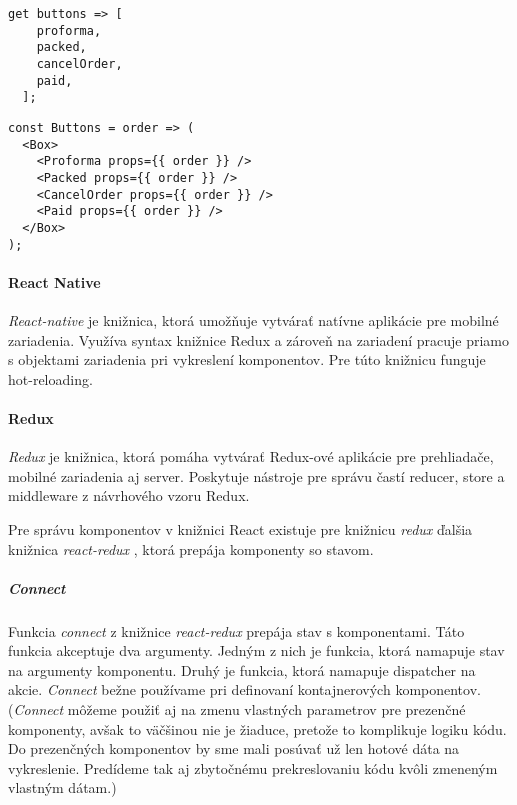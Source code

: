 \begin{lstlisting}[caption=Pole komponentov v Dart-e]
  get buttons => [
    proforma,
    packed,
    cancelOrder,
    paid,
  ];
\end{lstlisting}

\begin{lstlisting}[caption=Pole komponentov v JavaScript-e s použitím knižnice React]
const Buttons = order => (
  <Box>
    <Proforma props={{ order }} />
    <Packed props={{ order }} />
    <CancelOrder props={{ order }} />
    <Paid props={{ order }} />
  </Box>
);
\end{lstlisting}

\paragraph{React Native}
\emph{React-native} \cite{ReactNative} je knižnica, ktorá umožňuje vytvárať natívne aplikácie pre mobilné zariadenia. Využíva syntax knižnice Redux a zároveň na zariadení pracuje priamo s objektami zariadenia pri vykreslení komponentov. Pre túto knižnicu funguje hot-reloading.

\paragraph{Redux}
\emph{Redux} \cite{redux-lib} je knižnica, ktorá pomáha vytvárať Redux-ové aplikácie pre prehliadače, mobilné zariadenia aj server. Poskytuje nástroje pre správu častí reducer, store a middleware z návrhového vzoru Redux. 

Pre správu komponentov v knižnici React existuje pre knižnicu \emph{redux} ďalšia knižnica \emph{react-redux} \cite{react-redux}, ktorá prepája komponenty so stavom.

\subparagraph{Connect}
\label{func:connect}
Funkcia \emph{connect} z knižnice \emph{react-redux} \cite{react-redux} prepája stav s komponentami. Táto funkcia akceptuje dva argumenty. Jedným z nich je funkcia, ktorá namapuje stav na argumenty komponentu. Druhý je funkcia, ktorá namapuje dispatcher na akcie. %
\emph{Connect} bežne používame pri definovaní kontajnerových komponentov.
(\emph{Connect} môžeme použiť aj na zmenu vlastných parametrov pre prezenčné komponenty, avšak to väčšinou nie je žiaduce, pretože to komplikuje logiku kódu. Do prezenčných komponentov by sme mali posúvať už len hotové dáta na vykreslenie. Predídeme tak aj zbytočnému prekreslovaniu kódu kvôli zmeneným vlastným dátam.)


